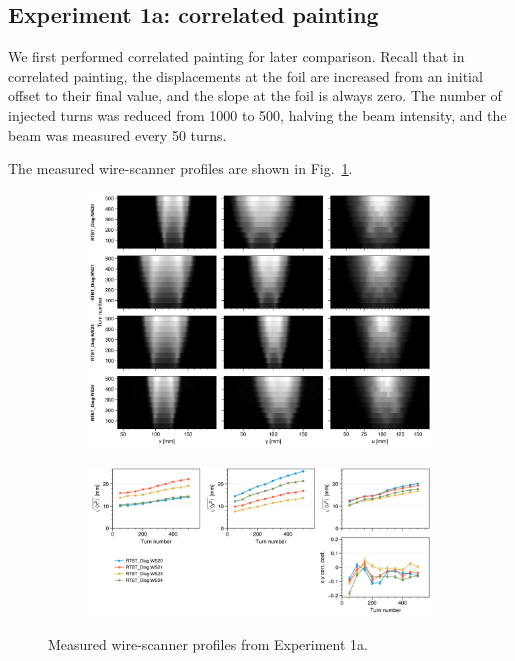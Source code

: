 \subsection{Experiment 1a: correlated painting}

We first performed correlated painting for later comparison. Recall that in correlated painting, the displacements at the foil are increased from an initial offset to their final value, and the slope at the foil is always zero. The number of injected turns was reduced from 1000 to 500, halving the beam intensity, and the beam was measured every 50 turns. 

The measured wire-scanner profiles are shown in Fig.~\ref{fig:exp1a_wsmeas}.
%
\begin{figure}[!p]
    \centering
    \begin{subfigure}{\textwidth}
        \includegraphics[width=\textwidth]{Images/chapter5/exp1a/waterfall.png}
    \end{subfigure}
    \vfill
    \vspace*{1.25cm}
    \vfill
    \begin{subfigure}{\textwidth}
        \includegraphics[width=\textwidth]{Images/chapter5/exp1a/rms.png}
    \end{subfigure}
    \caption{Measured wire-scanner profiles from Experiment 1a.}
    \label{fig:exp1a_wsmeas}
\end{figure}
